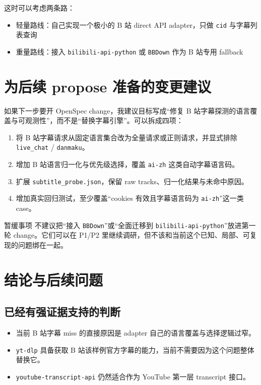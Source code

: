 \documentclass[a4paper]{article}
\begin{document}
这时可以考虑两条路：
\begin{itemize}
\item 轻量路线：自己实现一个极小的 B 站 direct API adapter，只做 \texttt{cid} 与字幕列表查询
\item 重量路线：接入 \texttt{bilibili-api-python} 或 \texttt{BBDown} 作为 B 站专用 fallback
\end{itemize}

\section{为后续 propose 准备的变更建议}

如果下一步要开 OpenSpec change，我建议目标写成“修复 B 站字幕探测的语言覆盖与可观测性”，而不是“替换字幕引擎”。可以拆成四项：

\begin{enumerate}
\item 将 B 站字幕请求从固定语言集合改为全量请求或正则请求，并显式排除 \texttt{live\_chat} / \texttt{danmaku}。
\item 增加 B 站语言归一化与优先级选择，覆盖 \texttt{ai-zh} 这类自动字幕语言码。
\item 扩展 \texttt{subtitle\_probe.json}，保留 raw tracks、归一化结果与未命中原因。
\item 增加真实回归测试，至少覆盖“cookies 有效且字幕语言码为 \texttt{ai-zh}”这一类 case。
\end{enumerate}

\begin{riskbox}{暂缓事项}
不建议把“接入 \texttt{BBDown}”或“全面迁移到 \texttt{bilibili-api-python}”放进第一轮 change。它们可以在 P1/P2 里继续调研，但不该和当前这个已知、局部、可复现的问题绑在一起。
\end{riskbox}

\section{结论与后续问题}

\subsection{已经有强证据支持的判断}

\begin{itemize}
\item 当前 B 站字幕 miss 的直接原因是 adapter 自己的语言覆盖与选择逻辑过窄。
\item \texttt{yt-dlp} 具备获取 B 站该样例官方字幕的能力，当前不需要因为这个问题整体替换它。
\item \texttt{youtube-transcript-api} 仍然适合作为 YouTube 第一层 transcript 接口。
\end{itemize}
\end{document}
